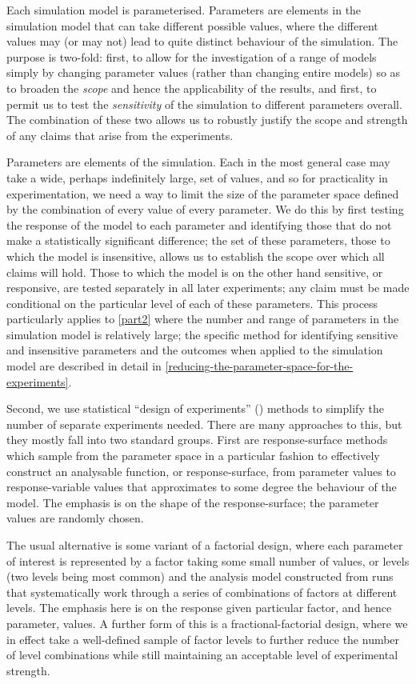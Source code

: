 Each simulation model is parameterised. Parameters are elements in the simulation model that can take different possible values, where the different values may (or may not) lead to quite distinct behaviour of the simulation. The purpose is two-fold: first, to allow for the investigation of a range of models simply by changing parameter values (rather than changing entire models) so as to broaden the \emph{scope} and hence the applicability of the results, and first, to permit us to test the \emph{sensitivity} of the simulation to different parameters overall. The combination of these two allows us to robustly justify the scope and strength of any claims that arise from the experiments.

Parameters are elements of the simulation. Each in the most general case may take a wide, perhaps indefinitely large, set of values, and so for practicality in experimentation, we need a way to limit the size of the parameter space defined by the combination of every value of every parameter. We do this by first testing the response of the model to each parameter and identifying those that do not make a statistically significant difference; the set of these parameters, those to which the model is insensitive, allows us to establish the scope over which all claims will hold. Those to which the model is on the other hand sensitive, or responsive, are tested separately in all later experiments; any claim must be made conditional on the particular level of each of these parameters. This process particularly applies to \cref{part2} where the number and range of parameters in the simulation model is relatively large; the specific method for identifying sensitive and insensitive parameters and the outcomes when applied to the simulation model are described in detail in \cref{reducing-the-parameter-space-for-the-experiments}.

Second, we use statistical ``design of experiments'' (\eg \cite{Montgomery2009}) methods to simplify the number of separate experiments needed. There are many approaches to this, but they mostly fall into two standard groups. First are response-surface methods which sample from the parameter space in a particular fashion to effectively construct an analysable function, or response-surface, from parameter values to response-variable values that approximates to some degree the behaviour of the model. The emphasis is on the shape of the response-surface; the parameter values are randomly chosen.

The usual alternative is some variant of a factorial design, where each parameter of interest is represented by a factor taking some small number of values, or levels (two levels being most common) and the analysis model constructed from runs that systematically work through a series of combinations of factors at different levels. The emphasis here is on the response given particular factor, and hence parameter, values. A further form of this is a fractional-factorial design, where we in effect take a well-defined sample of factor levels to further reduce the number of level combinations while still maintaining an acceptable level of experimental strength.

